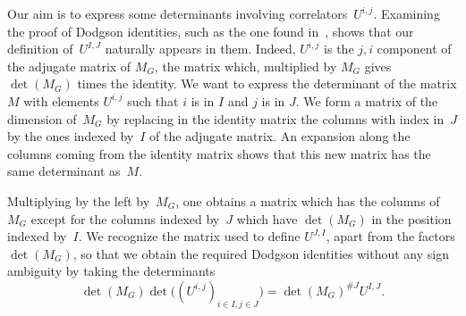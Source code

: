 Our aim is to express some determinants involving correlators~$U^{i,j}$. Examining the proof of Dodgson
identities, such
as the one found in~\cite{Br2009}, shows that our definition of~$U^{I ,J}$ naturally appears in them. Indeed, $U^{i,j}$
is the $j,i$ component of the adjugate matrix of $M_G$, the matrix which, multiplied by $M_G$ gives $\det(M_G)$
times the identity. We want to express the determinant of the matrix $M$ with elements $U^{i,j}$ such that $i$ is in $I$ and $j$ is in
$J$. We form a matrix of the dimension of~$M_G$ by replacing in the identity matrix the columns with index in~$J$ by the
ones indexed by~$I$ of the adjugate matrix. An expansion along the columns coming from the identity matrix shows
that this new matrix has the same determinant as~$M$.

Multiplying by the left by~$M_G$, one obtains a matrix which has the columns of~$M_G$ except for the columns indexed
by~$J$ which have $\det(M_G)$ in the position indexed by~$I$. We recognize the matrix used to define $U^{J,I}$,
apart from the factors $\det(M_G)$, so that we obtain the required Dodgson identities without any sign ambiguity by
taking the determinants
\[
	\det(M_G) \det\bigl( (U^{i,j})_{i\in I,j\in J} \bigr) = \det(M_G)^{\# J} U^{I ,J}.
\]

